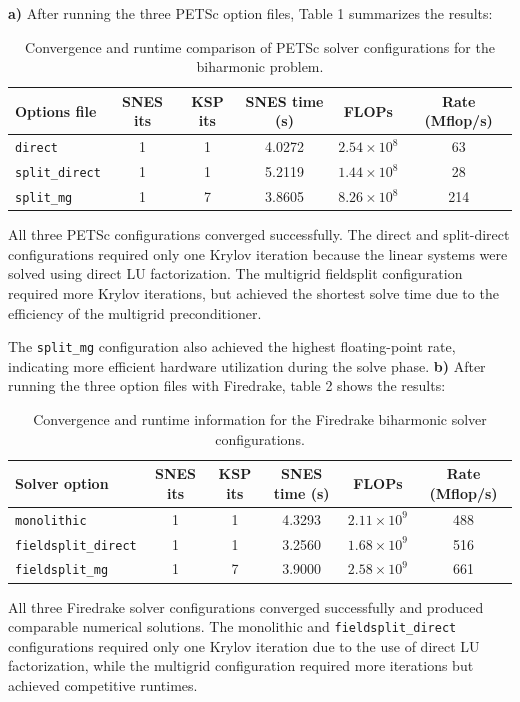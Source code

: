 \documentclass[12pt]{article}
\begin{document}
\textbf{a)} After running the three PETSc option files, Table 1 summarizes the results:

\begin{table}[h!]
\centering
\small
\begin{tabular}{lccccc}
\hline
\textbf{Options file} &
\textbf{SNES its} &
\textbf{KSP its} &
\textbf{SNES time (s)} &
\textbf{FLOPs} &
\textbf{Rate (Mflop/s)} \\
\hline
\texttt{direct}
& 1 & 1
& 4.0272
& $2.54\times10^8$
& 63 \\

\texttt{split\_direct}
& 1 & 1
& 5.2119
& $1.44\times10^8$
& 28 \\

\texttt{split\_mg}
& 1 & 7
& 3.8605
& $8.26\times10^8$
& 214 \\
\hline
\end{tabular}
\caption{Convergence and runtime comparison of PETSc solver configurations for the biharmonic problem.}
\label{tab:petsc_biharm}
\end{table}
All three PETSc configurations converged successfully. 
The direct and split-direct configurations required only one Krylov iteration because the linear systems were solved using direct LU factorization. 
The multigrid fieldsplit configuration required more Krylov iterations, but achieved the shortest solve time due to the efficiency of the multigrid preconditioner.

The \texttt{split\_mg} configuration also achieved the highest floating-point rate, indicating more efficient hardware utilization during the solve phase.
\newpage
\textbf{b)} After running the three option files with Firedrake, table 2 shows the results:


\begin{table}[h!]
\centering
\small
\begin{tabular}{lccccc}
\hline
\textbf{Solver option} &
\textbf{SNES its} &
\textbf{KSP its} &
\textbf{SNES time (s)} &
\textbf{FLOPs} &
\textbf{Rate (Mflop/s)} \\
\hline
\texttt{monolithic}
& 1 & 1 & 4.3293 & $2.11\times10^9$ & 488 \\
\texttt{fieldsplit\_direct}
& 1 & 1 & 3.2560 & $1.68\times10^9$ & 516 \\
\texttt{fieldsplit\_mg}
& 1 & 7 & 3.9000 & $2.58\times10^9$ & 661 \\
\hline
\end{tabular}
\caption{Convergence and runtime information for the Firedrake biharmonic solver configurations.}
\label{tab:firedrake_biharm}
\end{table}
All three Firedrake solver configurations converged successfully and produced comparable numerical solutions. 
The monolithic and \texttt{fieldsplit\_direct} configurations required only one Krylov iteration due to the use of direct LU factorization, while the multigrid configuration required more iterations but achieved competitive runtimes.
\end{document}
